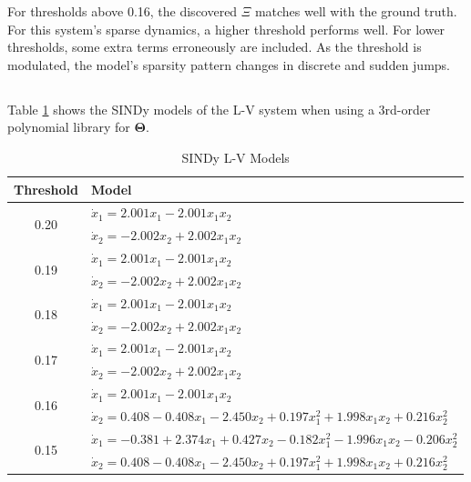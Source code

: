 \documentclass[11pt]{article}
\begin{document}
For thresholds above 0.16, the discovered $\Xi$ matches well with the ground truth. For this system's sparse dynamics, a higher threshold performs well. For lower thresholds, some extra terms erroneously are included. As the threshold is modulated, the model's sparsity pattern changes in discrete and sudden jumps.


\subsection{} %

Table \ref{p1dtab1} shows the SINDy models of the L-V system when using a 3rd-order polynomial library for $\mathbf{\Theta}$.

\begin{table}[H]
    \centering
    \caption{SINDy L-V Models}
    \label{p1dtab1}
    \begin{tabular}{|c|l|}
        \hline
        Threshold & Model \\
        \hline
        \hline
        \multirow{2}{*}{0.20} & $\dot{x}_1 = 2.001 x_1 - 2.001 x_1 x_2$ \\
                              & $\dot{x}_2 = -2.002 x_2 + 2.002 x_1 x_2$ \\
        \hline
        \multirow{2}{*}{0.19} & $\dot{x}_1 = 2.001 x_1 - 2.001 x_1 x_2$ \\
                              & $\dot{x}_2 = -2.002 x_2 + 2.002 x_1 x_2$ \\
        \hline
        \multirow{2}{*}{0.18} & $\dot{x}_1 = 2.001 x_1 - 2.001 x_1 x_2$ \\
                              & $\dot{x}_2 = -2.002 x_2 + 2.002 x_1 x_2$ \\
        \hline
        \multirow{2}{*}{0.17} & $\dot{x}_1 = 2.001 x_1 - 2.001 x_1 x_2$ \\
                              & $\dot{x}_2 = -2.002 x_2 + 2.002 x_1 x_2$ \\
        \hline
        \multirow{2}{*}{0.16} & $\dot{x}_1 = 2.001 x_1 - 2.001 x_1 x_2$ \\
                              & $\dot{x}_2 = 0.408 - 0.408 x_1 - 2.450 x_2 + 0.197 x_1^2 + 1.998 x_1 x_2 + 0.216 x_2^2$ \\
        \hline
        \multirow{2}{*}{0.15} & $\dot{x}_1 = -0.381 + 2.374 x_1 + 0.427 x_2 - 0.182 x_1^2 - 1.996 x_1 x_2 - 0.206 x_2^2$ \\
                              & $\dot{x}_2 = 0.408 - 0.408 x_1 - 2.450 x_2 + 0.197 x_1^2 + 1.998 x_1 x_2 + 0.216 x_2^2$ \\
        \hline
    \end{tabular}
\end{table}
\end{document}
